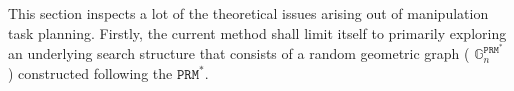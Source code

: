 This section inspects a lot of the theoretical issues arising out of manipulation task planning. Firstly, the current method shall limit itself to primarily exploring an underlying search structure that consists of a random geometric graph ( $\mathbb{G}_n^{\mathtt{PRM^*}}$ ) constructed following the $\mathtt{PRM^*}$\cite{Karaman2011Sampling-based-}.

